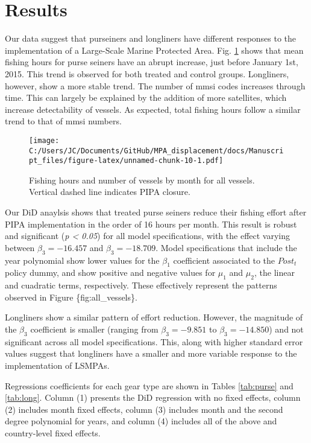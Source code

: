 \documentclass[12pt,]{article}
\begin{document}
\clearpage

\section{Results}\label{results}

Our data suggest that purseiners and longliners have different responses
to the implementation of a Large-Scale Marine Protected Area. Fig.
\ref{fig:all_vessels} shows that mean fishing hours for purse seiners
have an abrupt increase, just before January 1st, 2015. This trend is
observed for both treated and control groups. Longliners, however, show
a more stable trend. The number of mmsi codes increases through time.
This can largely be explained by the addition of more satellites, which
increase detectability of vessels. As expected, total fishing hours
follow a similar trend to that of mmsi numbers.

\begin{figure}
\centering
\texttt{[image: C:/Users/JC/Documents/GitHub/MPA\_displacement/docs/Manuscript\_files/figure-latex/unnamed-chunk-10-1.pdf]}
\caption{\label{fig:unnamed-chunk-10}\label{fig:all_vessels}Fishing hours
and number of vessels by month for all vessels. Vertical dashed line
indicates PIPA closure.}
\end{figure}

Our DiD anaylsis shows that treated purse seiners reduce their fishing
effort after PIPA implementation in the order of 16 hours per month.
This result is robust and significant (\emph{p \textless{} 0.05}) for
all model specifications, with the effect varying between
\(\beta_3 = -16.457\) and \(\beta_3 = -18.709\). Model specifications
that include the year polynomial show lower values for the \(\beta_1\)
coefficient associated to the \(Post_t\) policy dummy, and show positive
and negative values for \(\mu_1\) and \(\mu_2\), the linear and
cuadratic terms, respectively. These effectively represent the patterns
observed in Figure \{fig:all\_vessels\}.

Longliners show a similar pattern of effort reduction. However, the
magnitude of the \(\beta_3\) coefficient is smaller (ranging from
\(\beta_3 = -9.851\) to \(\beta_3 = -14.850\)) and not significant
across all model specifications. This, along with higher standard error
values suggest that longliners have a smaller and more variable response
to the implementation of LSMPAs.

Regressions coefficients for each gear type are shown in Tables
\ref{tab:purse} and \ref{tab:long}. Column (1) presents the DiD
regression with no fixed effects, column (2) includes month fixed
effects, column (3) includes month and the second degree polynomial for
years, and column (4) includes all of the above and country-level fixed
effects.
\end{document}
